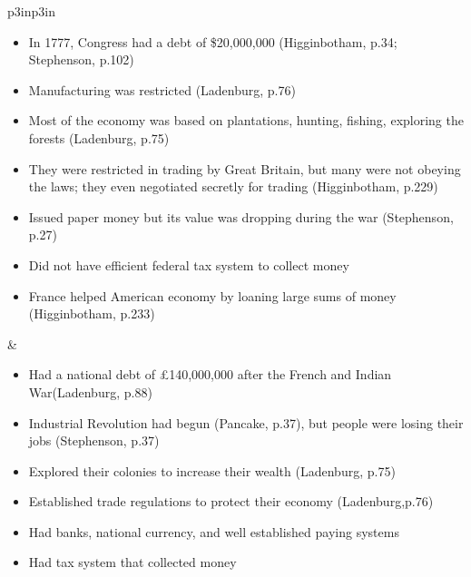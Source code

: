 \begin{singlespace}
\begin{mpxtabular}{p{3in}p{3in}}
\begin{itemize}[nolistsep,leftmargin=*]
	     \item In 1777, Congress had a debt of \$20,000,000 (Higginbotham, p.34; Stephenson, p.102)
	     \item Manufacturing was restricted (Ladenburg, p.76)
	     \item Most of the economy was based on plantations, hunting, fishing, exploring the forests (Ladenburg, p.75) 
	     \item They were restricted in trading by Great Britain, but many were not obeying the laws; they even negotiated secretly for trading (Higginbotham, p.229)
	     \item Issued paper money but its value  was dropping during the war (Stephenson, p.27)
	     \item Did not have efficient federal tax system to collect money 
	     \item France helped American economy by loaning large sums of money (Higginbotham, p.233)
	\end{itemize}
	&
	\begin{itemize}[nolistsep,leftmargin=*]
	    \item Had a national debt of £140,000,000 after the French and Indian War(Ladenburg, p.88) 
	    \item Industrial Revolution had begun (Pancake, p.37), but people were losing their jobs (Stephenson, p.37) 
	    \item Explored their colonies to increase their wealth (Ladenburg, p.75) 
	    \item Established trade regulations to protect their economy (Ladenburg,p.76) 
	    \item Had banks, national currency, and well established paying systems 
	    \item Had tax system that collected money 
	\end{itemize}\ML
	\end{mpxtabular}
\end{singlespace}
%
